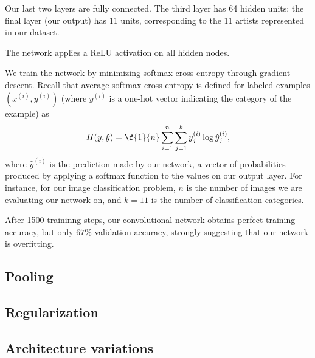 \documentclass{article}
\newcommand{\sind}[1]{^{(#1)}}
\begin{document}
\begin{multicols}{2}
Our last two layers are fully connected.
The third layer has 64 hidden units;
the final layer (our output) has 11 units,
corresponding to the 11 artists represented in our dataset.

The network applies a ReLU activation on all hidden nodes.

We train the network by minimizing softmax cross-entropy
through gradient descent.
Recall that average softmax cross-entropy is defined
for labeled examples $(x\sind{i}, y\sind{i})$
(where $y\sind{i}$ is a one-hot vector indicating the category of the example)
as
\begin{equation}
    H(y, \hat y) = \f{1}{n}\sum_{i=1}^n
                             \sum_{j=1}^k
                               y\sind{i}_j \log \hat y\sind{i}_j,
\end{equation}
where $\hat y\sind{i}$ is the prediction made by our network,
a vector of probabilities
produced by applying a softmax function
to the values on our output layer.
For instance, for our image classification problem,
$n$ is the number of images we are evaluating our network on,
and $k=11$ is the number of classification categories.

After 1500 traininng steps,
our convolutional network obtains perfect training accuracy,
but only $67\%$ validation accuracy,
strongly suggesting that our network is overfitting.

\subsection{Pooling}


\subsection{Regularization}


\subsection{Architecture variations}




\end{multicols}
\end{document}
